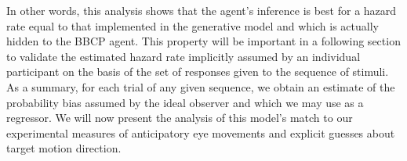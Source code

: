 \documentclass[10pt,letterpaper]{article}
\newcommand{\seeSec}[1]{Section~\ref{sec:#1}}
\begin{document}
In other words, this analysis shows that the agent's inference is best for a hazard rate
equal to that implemented in the generative model and which is actually hidden to the BBCP agent.
This property will be important in a following section
to validate the estimated hazard rate implicitly assumed by an individual participant
on the basis of the set of responses given to the  sequence of stimuli.
%
As a summary, for each trial of any given sequence,
we obtain an estimate of the probability bias assumed by the ideal observer
and which we may use as a regressor.
We will now present the analysis of this model's match
to our experimental measures of anticipatory eye movements and
explicit guesses about target motion direction.
\end{document}
